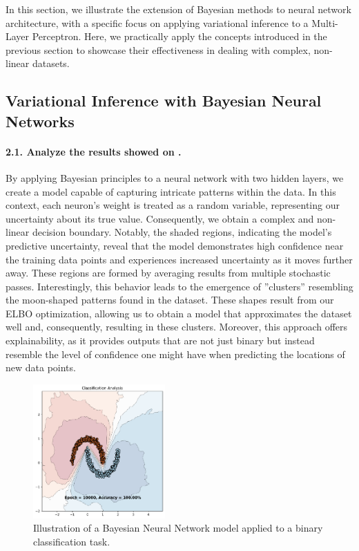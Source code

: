 In this section, we illustrate the extension of Bayesian methods to neural network architecture, with a specific focus on applying variational inference to a Multi-Layer Perceptron. Here, we practically apply the concepts introduced in the previous section to showcase their effectiveness in dealing with complex, non-linear datasets.

\subsection{Variational Inference with Bayesian Neural Networks}
\paragraph{2.1. Analyze the results showed on .}

By applying Bayesian principles to a neural network with two hidden layers, we create a model capable of capturing intricate patterns within the data. In this context, each neuron's weight is treated as a random variable, representing our uncertainty about its true value. Consequently, we obtain a complex and non-linear decision boundary. Notably, the shaded regions, indicating the model's predictive uncertainty, reveal that the model demonstrates high confidence near the training data points and experiences increased uncertainty as it moves further away. These regions are formed by averaging results from multiple stochastic passes. Interestingly, this behavior leads to the emergence of ''clusters'' resembling the moon-shaped patterns found in the dataset. These shapes result from our ELBO optimization, allowing us to obtain a model that approximates the dataset well and, consequently, resulting in these clusters. Moreover, this approach offers explainability, as it provides outputs that are not just binary but instead resemble the level of confidence one might have when predicting the locations of new data points.

\begin{figure}[H]
    \centering
    \includegraphics[width=0.45\textwidth]{mlp_variational.pdf}
    \caption{Illustration of a Bayesian Neural Network model applied to a binary classification task.}
    \label{fig:mlp_variational}
\end{figure}


